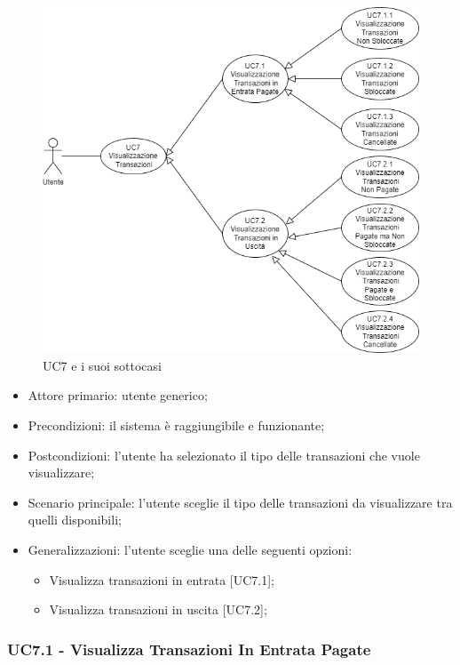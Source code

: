 \begin{figure}[H]
    \centering
    \includegraphics[scale=0.7]{immagini/UseCases-UC7.png}
    \caption{UC7 e i suoi sottocasi}
\end{figure}

\begin{itemize}
    \item Attore primario: utente generico;
    \item Precondizioni: il sistema è raggiungibile e funzionante;
    \item Postcondizioni: l'utente ha selezionato il tipo delle transazioni che vuole visualizzare;
    \item Scenario principale: l'utente sceglie il tipo delle transazioni da visualizzare tra quelli disponibili;
    \item Generalizzazioni: l'utente sceglie una delle seguenti opzioni:
          \begin{itemize}
              \item Visualizza transazioni in entrata [UC7.1];
              \item Visualizza transazioni in uscita [UC7.2];
          \end{itemize}
\end{itemize}

\subsubsection{UC7.1 - Visualizza Transazioni In Entrata Pagate}

